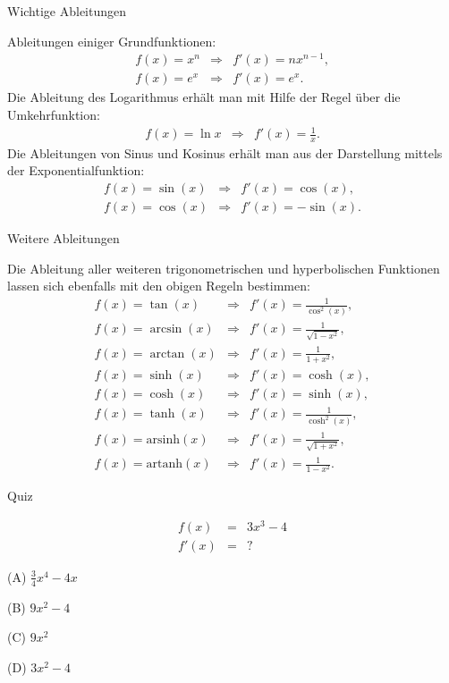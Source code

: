 \documentclass[german]{beamer}
\newcommand{\bq}{\begin{eqnarray*}}
\newcommand{\eq}{\end{eqnarray*}}
\begin{document}
\begin{frame}{Wichtige Ableitungen}

Ableitungen einiger \alert{Grundfunktionen}:
\bq
 f(x) = x^n & \Rightarrow & f'(x) = n x^{n-1},
 \nonumber \\
 f(x) = e^x & \Rightarrow & f'(x) = e^x.
\eq
Die Ableitung des \alert{Logarithmus} erh\"alt man mit Hilfe der Regel \"uber die Umkehrfunktion:
\bq
 f(x) = \ln x & \Rightarrow & f'(x) = \frac{1}{x}.
\eq
Die Ableitungen von \alert{Sinus} und \alert{Kosinus} erh\"alt man aus der Darstellung
mittels der Exponentialfunktion:
\bq
 f(x) = \sin(x) & \Rightarrow & f'(x) = \cos(x),
 \nonumber \\
 f(x) = \cos(x) & \Rightarrow & f'(x) = -\sin(x).
\eq

\end{frame}

\begin{frame}{Weitere Ableitungen}

Die Ableitung aller weiteren trigonometrischen und hyperbolischen Funktionen lassen sich ebenfalls mit den
obigen Regeln bestimmen:
{\small
\bq
 f(x) = \tan(x) & \Rightarrow & f'(x) = \frac{1}{\cos^2(x)},
 \nonumber \\
 f(x) = \arcsin(x) & \Rightarrow & f'(x) = \frac{1}{\sqrt{1-x^2}},
 \nonumber \\
 f(x) = \arctan(x) & \Rightarrow & f'(x) = \frac{1}{1+x^2},
 \nonumber \\
 f(x) = \sinh(x) & \Rightarrow & f'(x) = \cosh(x),
 \nonumber \\
 f(x) = \cosh(x) & \Rightarrow & f'(x) = \sinh(x),
 \nonumber \\
 f(x) = \tanh(x) & \Rightarrow & f'(x) = \frac{1}{\cosh^2(x)},
 \nonumber \\
 f(x) = \mbox{arsinh}(x) & \Rightarrow & f'(x) = \frac{1}{\sqrt{1+x^2}},
 \nonumber \\
 f(x) = \mbox{artanh}(x) & \Rightarrow & f'(x) = \frac{1}{1-x^2}.
\eq
}

\end{frame}

\begin{frame}{Quiz}

\bq
 f\left(x\right) & = & 3 x^3 -4
 \nonumber \\
 f'\left(x\right) & = & ?
\eq
\begin{description}
\item{(A)} $\frac{3}{4}x^4-4x$
\item{(B)} $9 x^2 - 4$
\item{(C)} $9x^2$
\item{(D)} $3x^2-4$
\end{description}

\end{frame}
\end{document}
